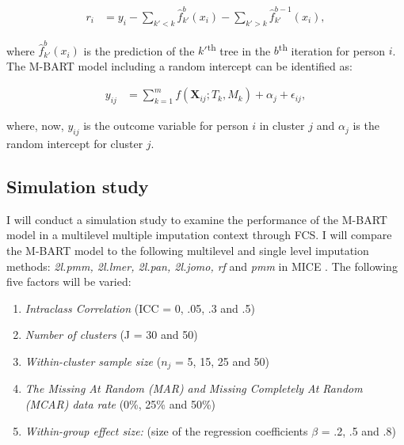 \documentclass[10pt, a4paper, titlepage]{article}
\begin{document}
\begin{subequations}
\label{eq:partialresiduals}
\begin{align}
r_i &= y_i - \sum_{k' < k} \hat{f}^{b}_{k'}(x_{i}) - \sum_{k' > k} \hat{f}^{b-1}_{k'}(x_{i}), \tag{2}
\end{align}
\end{subequations}

where $\hat{f}^{b}_{k'}(x_{i})$ is the prediction of the $k'$\textsuperscript{th} tree in the $b$\textsuperscript{th} iteration for person $i$. The M-BART model including a random intercept can be identified as:

\begin{subequations}
\label{eq:M-BART}
\begin{align}
y_{ij} &= \sum_{k=1}^{m} f(\textbf{X}_{ij}; T_{k}, M_{k}) + \alpha_{j} + \epsilon_{ij}, \tag{3}
\end{align}
\end{subequations}

where, now, $y_{ij}$ is the outcome variable for person $i$ in cluster $j$ and $\alpha_{j}$ is the random intercept for cluster $j$.

\subsection{Simulation study}
I will conduct a simulation study to examine the performance of the M-BART model in a multilevel multiple imputation context through FCS. I will compare the M-BART model to the following multilevel and single level imputation methods: \textit{2l.pmm, 2l.lmer, 2l.pan, 2l.jomo, rf} and \textit{pmm} in MICE \citep{buuren2011}.
The following five factors will be varied:
\begin{enumerate}
	\item \textit{Intraclass Correlation} (ICC = 0, .05, .3 and .5)
	\item \textit{Number of clusters} (J = 30 and 50)
	\item \textit{Within-cluster sample size}  ($n_{j}$ = 5, 15, 25 and 50)
	\item \textit{The Missing At Random (MAR) and Missing Completely At Random (MCAR) data rate} (0\%, 25\% and 50\%)
	\item \textit{Within-group effect size:} (size of the regression coefficients $\beta$ = .2, .5 and .8)
\end{enumerate}
\end{document}
